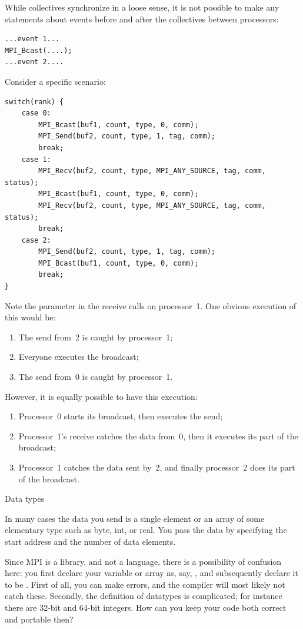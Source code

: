 While collectives synchronize in a loose sense, it is not possible to
make any statements about events before and after the collectives
between processors:
\begin{verbatim}
...event 1...
MPI_Bcast(....);
...event 2....
\end{verbatim}
Consider a specific scenario:
\begin{verbatim}
switch(rank) { 
    case 0: 
        MPI_Bcast(buf1, count, type, 0, comm); 
        MPI_Send(buf2, count, type, 1, tag, comm); 
        break; 
    case 1: 
        MPI_Recv(buf2, count, type, MPI_ANY_SOURCE, tag, comm, status); 
        MPI_Bcast(buf1, count, type, 0, comm); 
        MPI_Recv(buf2, count, type, MPI_ANY_SOURCE, tag, comm, status); 
        break; 
    case 2: 
        MPI_Send(buf2, count, type, 1, tag, comm); 
        MPI_Bcast(buf1, count, type, 0, comm); 
        break; 
}
\end{verbatim}
Note the  parameter in the receive calls on processor~1.
One obvious execution of this would be:
\begin{enumerate}
\item The send from~2 is caught by processor~1;
\item Everyone executes the broadcast;
\item The send from~0 is caught by processor~1.
\end{enumerate}
However, it is equally possible to have this execution:
\begin{enumerate}
\item Processor~0 starts its broadcast, then executes the send;
\item Processor~1's receive catches the data from~0, then it executes
  its part of the broadcast;
\item Processor~1 catches the data sent by~2, and finally processor~2
  does its part of the broadcast.
\end{enumerate}


 {Data types}

In many cases the data you send is a single element or an array of some 
elementary type such as byte, int, or real. You pass the data by specifying
the start address and the number of data elements.

Since MPI is a library, and not a language, there is a possibility of 
confusion here: you first declare your variable or array as, say, ,
and subsequently declare it to be . First of all, you
can make errors, and the compiler will most likely not catch these.
Secondly, the definition of datatypes is complicated; for instance there
are 32-bit and 64-bit integers. How can you keep your code both 
correct and portable then?

